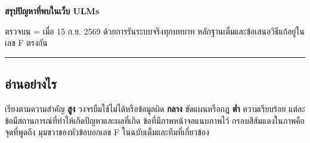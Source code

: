 %



\renewcommand{\docshort}{สรุปปัญหาเว็บ ULMs}


\usepackage{needspace}
\newcommand{\issue}[4]{\par\needspace{7\baselineskip}\medskip\noindent
  {\sansall\bfseries\color{ink}#1\quad #2}\hfill
  {\sansall\scriptsize\color{muted}#3\quad\textbf{#4}}\par\nopagebreak\smallskip}
\newcommand{\lab}[1]{{\sansall\small\bfseries\color{ctr!80!black}#1}\ }
\newcommand{\prio}[2]{\section*{\textcolor{#1}{#2}}\markboth{#2}{}}

\setlength{\parskip}{0.2em}



{\sansall\bfseries\fontsize{22}{28}\selectfont\color{ctr!90!black} สรุปปัญหาที่พบในเว็บ ULMs\par}
\vspace{2pt}
{\sansall\small\color{muted} ตรวจบน  =  เมื่อ 15 ก.ย. 2569 ด้วยการรันระบบจริงทุกบทบาท
หลักฐานเต็มและข้อเสนอวิธีแก้อยู่ใน  เลข F ตรงกัน\par}

\vspace{6pt}
\noindent\rule{\textwidth}{0.4pt}

\subsection*{อ่านอย่างไร}
เรียงตามความสำคัญ \textcolor{phigh}{\textbf{สูง}} วงจรยืมใช้ไม่ได้หรือข้อมูลผิด
\textcolor{pmid}{\textbf{กลาง}} ขัดแผนหรือกฎ \textcolor{plow}{\textbf{ต่ำ}} ความเรียบร้อย
แต่ละข้อมีสถานการณ์ที่ทำให้เกิดปัญหาและผลที่เกิด ข้อที่มีภาพหน้าจอแนบภาพไว้ กรอบสีส้มแดงในภาพคือจุดที่พูดถึง
มุมขวาของหัวข้อบอกเลข F ในฉบับเต็มและทีมที่เกี่ยวข้อง

